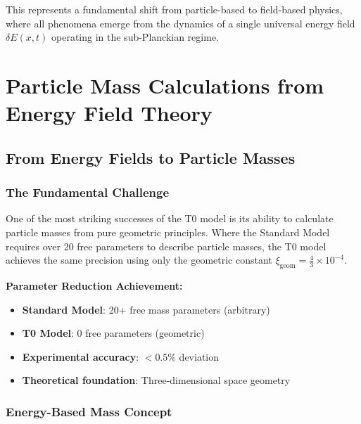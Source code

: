 \documentclass[12pt,a4paper]{report}
\newcommand{\xigeom}{\xi_{\text{geom}}}   %
\begin{document}
	This represents a fundamental shift from particle-based to field-based physics, where all phenomena emerge from the dynamics of a single universal energy field $\delta E(x,t)$ operating in the sub-Planckian regime.

\chapter{Particle Mass Calculations from Energy Field Theory}
\label{chap:particle_mass_calculations}

\section{From Energy Fields to Particle Masses}
\label{sec:energy_fields_to_masses}

\subsection{The Fundamental Challenge}
\label{subsec:fundamental_challenge}

One of the most striking successes of the T0 model is its ability to calculate particle masses from pure geometric principles. Where the Standard Model requires over 20 free parameters to describe particle masses, the T0 model achieves the same precision using only the geometric constant $\xigeom = \frac{4}{3} \times 10^{-4}$.

\begin{tcolorbox}[colback=green!5!white,colframe=green!75!black,title=Mass Revolution]
	\textbf{Parameter Reduction Achievement:}
	\begin{itemize}
		\item \textbf{Standard Model}: 20+ free mass parameters (arbitrary)
		\item \textbf{T0 Model}: 0 free parameters (geometric)
		\item \textbf{Experimental accuracy}: $< 0.5\%$ deviation
		\item \textbf{Theoretical foundation}: Three-dimensional space geometry
	\end{itemize}
\end{tcolorbox}

\subsection{Energy-Based Mass Concept}
\label{subsec:energy_based_mass}
\end{document}

